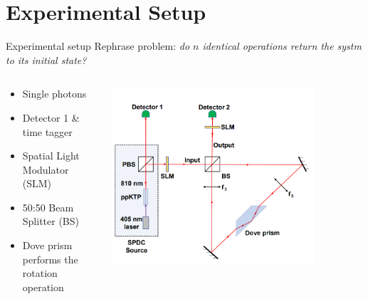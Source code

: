 \documentclass[aspectratio=169,9pt]{beamer}
\begin{document}
\section{Experimental Setup}
\begin{frame}[t]{Experimental setup}
  Rephrase problem: \textit{do $n$ identical operations return the systm to its initial state?}
  \begin{columns}[T]
    \begin{column}{0.4\textwidth}
      \begin{itemize}
        \item Single photons
        \item Detector 1 \& time tagger
        \item Spatial Light Modulator (SLM)
        \item 50:50 Beam Splitter (BS)
        \item Dove prism performs the rotation operation
      \end{itemize}
    \end{column}
    \begin{column}{0.6\textwidth}
      \includegraphics[width=0.8\textwidth]{experimental_setup.png}\\
    \end{column}
  \end{columns}
\end{frame}
\end{document}
